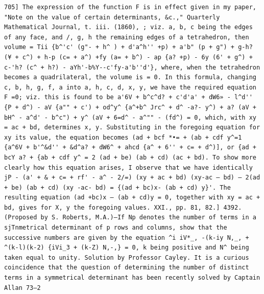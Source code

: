 \documentclass[11pt,a4paper]{book}
\begin{document}
\newpage
\setcounter{page}{579}
\begin{verbatim}
705] The expression of the function F is in effect given in my paper, "Note on the value of certain determinants, &c.," Quarterly Mathematical Journal, t. iii. (1860), ; viz. a, b, c being the edges of any face, and /, g, h the remaining edges of a tetrahedron, then volume = Tii {b^'c' (g"- + h^ ) + d'a^h'' +p) + a'b" (p + g") + g-h? (¥ + c^) + h-p (c= + a^) +fy (a= + b^) - ap {a? +p) - 6y (6' + g^) + c-'h? (c^ + h?) - aYh'-b%Y--c'fy-a'b''d'}, where, when the tetrahedron becomes a quadrilateral, the volume is = 0. In this formula, changing c, b, h, g, f, a into a, h, c, d, x, y, we have the required equation F =0; viz. this is found to be a'6V + b^c^d? + c'd'a' + dW6» - l^d'' {P + d^) - aV {a"" + c') + od^y^ {a^+b^ Jrc^ + d^ -a?- y^) + a? (aV + bH^ - a^d' - b^c") + y^ (aV + 6=d^ - a^"" - (fd^) = 0, which, with xy = ac + bd, determines x, y. Substituting in the foregoing equation for xy its value, the equation becomes (ad + bcf *•= + (ab + cdf y^=1 {a^6V + b'^&d'' + &d^a? + dW6^ + ahcd {a^ + 6'' + c= + d^)], or {ad + bcY a? + {ab + cdf y^ = 2 (ad + be) (ab + cd) (ac + bd). To show more clearly how this equation arises, I observe that we have identically jP - (a' + & + c= + rf' - a^ - 2/=) (xy + ac + bd) (xy-ac — bd) — 2(ad + be) (ab + cd) (xy -ac- bd) = {(ad + bc)x- (ab + cd) y}'. The resulting equation (ad +bc)x — (ab + cd)y = 0, together with xy = ac + bd, gives for X, y the foregoing values. XXI., pp. 81, 82.] 4392. (Proposed by S. Roberts, M.A.)—If Np denotes the number of terms in a sjTnmetrical determinant of p rows and columns, show that the successive numbers are given by the equation ^i iV*_, -(k-iy N,_, + ^(k-l)(k-2) {iVi_3 + (k-Z) N,-,} = 0, k being positive and N^ being taken equal to unity. Solution by Professor Cayley. It is a curious coincidence that the question of determining the number of distinct terms in a symmetrical determinant has been recently solved by Captain Allan 73—2 
\end{verbatim}
\end{document}

